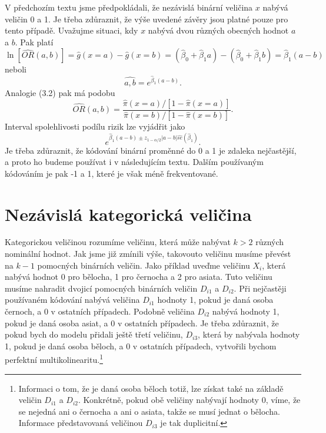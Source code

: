 V předchozím textu jsme předpokládali, že nezávislá binární veličina $x$ nabývá veličin 0 a 1. Je třeba zdůraznit, že výše uvedené závěry jsou platné pouze pro tento případě. Uvažujme situaci, kdy $x$ nabývá dvou různých obecných hodnot $a$ a $b$. Pak platí
\begin{equation}
\ln[\widehat{OR}(a, b)] = \hat{g}(x = a) - \hat{g}(x = b) = (\hat{\beta}_0 + \hat{\beta}_1 a) - (\hat{\beta}_0 + \hat{\beta}_1 b) = \hat{\beta}_1 (a - b)
\end{equation}
neboli
\begin{equation}
\widehat{a, b} = e^{\hat{\beta}_1 (a - b)}.
\end{equation}
Analogie (3.2) pak má podobu
\begin{equation}
\widehat{OR}(a, b) = \frac{\hat{\pi}(x = a) / [1 - \hat{\pi}(x = a)]}{\hat{\pi}(x = b) / [1 - \hat{\pi}(x = b)]}.
\end{equation}
Interval spolehlivosti podílu rizik lze vyjádřit jako
\begin{equation}
e^{\hat{\beta}_1(a - b) \pm z_{1 - \alpha / 2}|a - b| \widehat{se}(\hat{\beta}_1)}.
\end{equation}
Je třeba zdůraznit, že kódování binární proměnné do 0 a 1 je zdaleka nejčastější, a proto ho budeme používat i v následujícím textu. Dalším používaným kódováním je pak -1 a 1, které je však méně frekventované.

\section{Nezávislá kategorická veličina}

Kategorickou veličinou rozumíme veličinu, která může nabývat $k > 2$ různých nominální hodnot. Jak jsme již zmínili výše, takovouto veličinu musíme převést na $k - 1$ pomocných binárních veličin. Jako příklad uveďme veličinu $X_i$, která nabývá hodnot 0 pro bělocha, 1 pro černocha a 2 pro asiata. Tuto veličinu musíme nahradit dvojicí pomocných binárních veličin $D_{i1}$ a $D_{i2}$. Při nejčastěji používaném kódování nabývá veličina $D_{i1}$ hodnoty 1, pokud je daná osoba černoch, a 0 v ostatních případech. Podobně veličina $D_{i2}$ nabývá hodnoty 1, pokud je daná osoba asiat, a 0 v ostatních případech. Je třeba zdůraznit, že pokud bych do modelu přidali ještě třetí veličinu, $D_{i3}$, která by nabývala hodnoty 1, pokud je daná osoba běloch, a 0 v ostatních případech, vytvořili bychom perfektní multikolinearitu.\footnote{Informaci o tom, že je daná osoba běloch totiž, lze získat také na základě veličin $D_{i1}$ a $D_{i2}$. Konkrétně, pokud obě veličiny nabývají hodnoty 0, víme, že se nejedná ani o černocha a ani o asiata, takže se musí jednat o bělocha. Informace představovaná veličinou $D_{i3}$ je tak duplicitní.}

